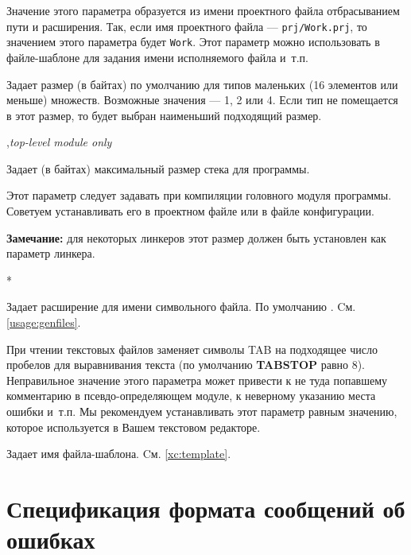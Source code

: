 \begin{description}
Значение этого параметра образуется из имени проектного файла
отбрасыванием пути и расширения. Так, если имя проектного файла
---  \verb'prj/Work.prj', то значением этого параметра будет
\verb'Work'. Этот параметр можно использовать в файле-шаблоне
для задания имени исполняемого файла и~т.п.

        \MLBegin{}\ModeC{}\MLEnd \inline

Задает размер (в байтах) по умолчанию для типов маленьких 
(16 элементов или меньше) множеств. Возможные значения ---
1, 2 или 4. Если тип не помещается в этот размер, то будет выбран
наименьший подходящий размер.

        \MLBegin{}\ModeC{},{\em top-level module only}\MLEnd{}

Задает (в байтах) максимальный размер стека для программы.

Этот параметр следует задавать при компиляции головного модуля
программы. Советуем устанавливать его в проектном файле или в
файле конфигурации.

\ifgencode
        {\bf Замечание:} для некоторых линкеров этот размер должен быть 
установлен как параметр линкера.
\fi

        \MLBegin{}*\MLEnd{}

Задает расширение для имени символьного файла.
По умолчанию {\bf \Sym}. Cм. \ref{usage:genfiles}.

        \MLBegin{}\ModeG{}\MLEnd{}

При чтении текстовых файлов \xds{} заменяет символы TAB 
на подходящее число пробелов для выравнивания текста (по умолчанию
{\bf TABSTOP} равно 8). Неправильное значение этого параметра
может привести к не туда попавшему комментарию в псевдо-определяющем 
модуле, к неверному указанию места ошибки и~т.п. Мы рекомендуем
устанавливать этот параметр равным значению, которое используется в 
Вашем текстовом редакторе.

        \MLBegin{}\ModeG{}\MLEnd{}

Задает имя файла-шаблона. Cм. \ref{xc:template}.

\ifonline \else
\end{description}
\fi

\section{Спецификация формата сообщений об ошибках}\label{opt:errfmt}

